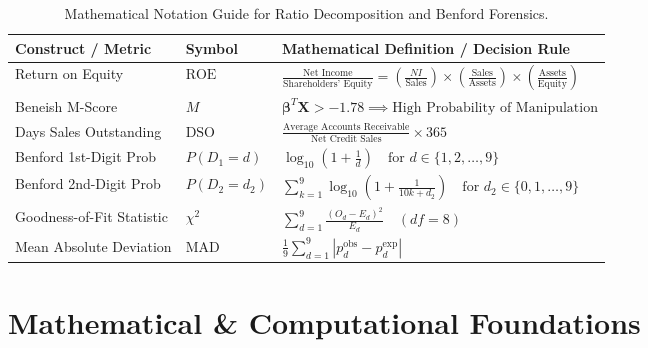 \begin{table}[htbp]
\centering
\small
\begin{tabularx}{\textwidth}{llX}
\toprule
\textbf{Construct / Metric} & \textbf{Symbol} & \textbf{Mathematical Definition / Decision Rule} \\
\midrule
Return on Equity & $\text{ROE}$ & $\frac{\text{Net Income}}{\text{Shareholders' Equity}} = \left(\frac{NI}{\text{Sales}}\right) \times \left(\frac{\text{Sales}}{\text{Assets}}\right) \times \left(\frac{\text{Assets}}{\text{Equity}}\right)$ \\
Beneish M-Score & $M$ & $\boldsymbol{\beta}^T \mathbf{X} > -1.78 \implies \text{High Probability of Manipulation}$ \\
Days Sales Outstanding & $\text{DSO}$ & $\frac{\text{Average Accounts Receivable}}{\text{Net Credit Sales}} \times 365$ \\
Benford 1st-Digit Prob & $P(D_1 = d)$ & $\log_{10}\left(1 + \frac{1}{d}\right) \quad \text{for } d \in \{1, 2, \dots, 9\}$ \\
Benford 2nd-Digit Prob & $P(D_2 = d_2)$ & $\sum_{k=1}^9 \log_{10}\left(1 + \frac{1}{10k + d_2}\right) \quad \text{for } d_2 \in \{0, 1, \dots, 9\}$ \\
Goodness-of-Fit Statistic & $\chi^2$ & $\sum_{d=1}^9 \frac{(O_d - E_d)^2}{E_d} \quad (df = 8)$ \\
Mean Absolute Deviation & $\text{MAD}$ & $\frac{1}{9} \sum_{d=1}^9 |p_d^{\text{obs}} - p_d^{\text{exp}}|$ \\
\bottomrule
\end{tabularx}
\caption{Mathematical Notation Guide for Ratio Decomposition and Benford Forensics.}
\label{tab:w5_notation}
\end{table}

\section{Mathematical \& Computational Foundations}

